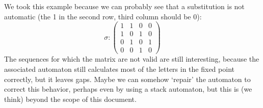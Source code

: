 \documentclass{article}
\begin{document}
We took this example because we can probably see that a substitution is not
automatic (the 1 in the second row, third column should be 0):
\begin{displaymath}
\sigma: \left( \begin{array}{cccc}
1 & 1 & 0 & 0 \\
1 & 0 & 1 & 0 \\
0 & 1 & 0 & 1 \\
0 & 0 & 1 & 0
\end{array} \right)
\end{displaymath}
The sequences for which the matrix are not valid are still interesting, because
the associated automaton still calculates most of the letters in the fixed
point correctly, but it leaves gaps.
Maybe we can somehow `repair' the automaton to correct this behavior, 
perhaps even by using a stack automaton, but this is (we think) beyond the
scope of this document.

\end{document}
